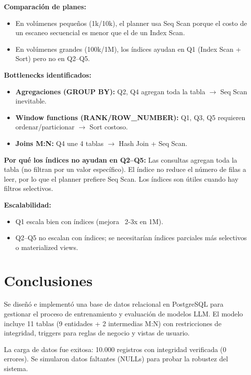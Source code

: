 \documentclass[12pt,a4paper]{article}
\begin{document}
\textbf{Comparación de planes:}
\begin{itemize}
  \item En volúmenes pequeños (1k/10k), el planner usa Seq Scan porque el costo de un escaneo secuencial es menor que el de un Index Scan.
  \item En volúmenes grandes (100k/1M), los índices ayudan en Q1 (Index Scan + Sort) pero no en Q2–Q5.
\end{itemize}

\textbf{Bottlenecks identificados:}
\begin{itemize}
  \item \textbf{Agregaciones (GROUP BY):} Q2, Q4 agregan toda la tabla $\rightarrow$ Seq Scan inevitable.
  \item \textbf{Window functions (RANK/ROW\_NUMBER):} Q1, Q3, Q5 requieren ordenar/particionar $\rightarrow$ Sort costoso.
  \item \textbf{Joins M:N:} Q4 une 4 tablas $\rightarrow$ Hash Join + Seq Scan.
\end{itemize}

\textbf{Por qué los índices no ayudan en Q2–Q5:}
Las consultas agregan toda la tabla (no filtran por un valor específico). El índice no reduce el número de filas a leer, por lo que el planner prefiere Seq Scan. Los índices son útiles cuando hay filtros selectivos.

\textbf{Escalabilidad:}
\begin{itemize}
  \item Q1 escala bien con índices (mejora ~2-3x en 1M).
  \item Q2–Q5 no escalan con índices; se necesitarían índices parciales más selectivos o materialized views.
\end{itemize}

\section{Conclusiones}

Se diseñó e implementó una base de datos relacional en PostgreSQL para gestionar el proceso de entrenamiento y evaluación de modelos LLM. El modelo incluye 11 tablas (9 entidades + 2 intermedias M:N) con restricciones de integridad, triggers para reglas de negocio y vistas de usuario.

La carga de datos fue exitosa: 10.000 registros con integridad verificada (0 errores). Se simularon datos faltantes (NULLs) para probar la robustez del sistema.
\end{document}
